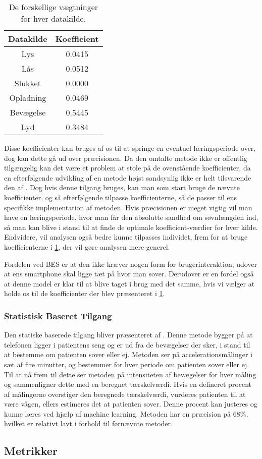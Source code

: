 \begin{table}[h]
\centering
\begin{tabular}{|c|c|}
\hline Datakilde & Koefficient\\
\hline Lys & 0.0415 \\ 
\hline Lås & 0.0512 \\ 
\hline Slukket & 0.0000 \\ 
\hline Opladning & 0.0469 \\ 
\hline Bevægelse & 0.5445 \\ 
\hline Lyd & 0.3484 \\ 
\hline 
\end{tabular}
\caption{De forskellige vægtninger for hver datakilde.}
\label{tab:vaegtninger}
\end{table}

Disse koefficienter kan bruges af os til at springe en eventuel læringsperiode over, dog kan dette gå ud over præcisionen. 
Da den omtalte metode ikke er offentlig tilgængelig kan det være et problem at stole på de ovenstående koefficienter, da en efterfølgende udvikling af en metode højst sandsynlig ikke er helt tilsvarende den af \citet{6563918}.
Dog hvis denne tilgang bruges, kan man som start bruge de nævnte koefficienter, og så efterfølgende tilpasse koefficienterne, så de passer til ens specifikke implementation af metoden.
Hvis præcisionen er meget vigtig vil man have en læringsperiode, hvor man får den absolutte sandhed om søvnlængden ind, så man kan blive i stand til at finde de optimale koefficient-værdier for hver kilde.
Endvidere, vil analysen også bedre kunne tilpasses individet, frem for at bruge koefficienterne i \cref{tab:vaegtninger}, der vil gøre analysen mere generel.

Fordelen ved BES er at den ikke kræver nogen form for brugerinteraktion, udover at ens smartphone skal ligge tæt på hvor man sover.
Derudover er en fordel også at denne model er klar til at blive taget i brug med det samme, hvis vi vælger at holde os til de koefficienter der blev præsenteret i \cref{tab:vaegtninger}.

\subsubsection{Statistisk Baseret Tilgang}\label{sec:statbased}
Den statiske baserede tilgang bliver præsenteret af \citet{misc:statbased}.
Denne metode bygger på at telefonen ligger i patientens seng og er ud fra de bevægelser der sker, i stand til at bestemme om patienten sover eller ej. 
Metoden ser på accelerationsmålinger i sæt af fire minutter, og bestemmer for hver periode om patienten sover eller ej.
Til at nå frem til dette ser metoden på intensiteten af bevægelser for hver måling og sammenligner dette med en beregnet tærskelværdi.
Hvis en defineret procent af målingerne overstiger den beregnede tærskelværdi, vurderes patienten til at være vågen, ellers estimeres det at patienten sover.
Denne procent kan justeres og kunne læres ved hjælp af machine learning.
Metoden har en præcision på 68\%, hvilket er relativt lavt i forhold til førnævnte metoder.

\subsection{Metrikker}\label{sec:metrikker}
